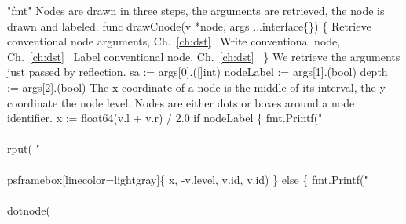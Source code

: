 "fmt"
\nwendcode{}\nwdocspar
Nodes are drawn in three steps, the arguments are retrieved, the node
is drawn and labeled.
\nwenddocs{}\plusendmoddef\nwstartdeflinemarkup{}\nwenddeflinemarkup
func drawCnode(v *node, args ...interface\{\}) \{
          \LA{}Retrieve conventional node arguments, Ch.~\ref{ch:dst}~{\nwtagstyle{}}\RA{}
          \LA{}Write conventional node, Ch.~\ref{ch:dst}~{\nwtagstyle{}}\RA{}
          \LA{}Label conventional node, Ch.~\ref{ch:dst}~{\nwtagstyle{}}\RA{}
\}
\nwendcode{}\nwdocspar
We retrieve the arguments just passed by reflection.
\nwenddocs{}\endmoddef\nwstartdeflinemarkup{}\nwenddeflinemarkup
sa := args[0].([]int)
nodeLabel := args[1].(bool)
depth := args[2].(bool)
\nwendcode{}\nwdocspar
The x-coordinate of a node is the middle of its interval, the
y-coordinate the node level. Nodes are either dots or boxes around a
node identifier.
\nwenddocs{}\endmoddef\nwstartdeflinemarkup{}\nwenddeflinemarkup
x := float64(v.l + v.r) / 2.0
if nodeLabel \{
          fmt.Printf("\\\\rput(%
                  "\\\\psframebox[linecolor=lightgray]\{%
                  x, -v.level, v.id, v.id)
\} else \{
          fmt.Printf("\\\\dotnode(%
